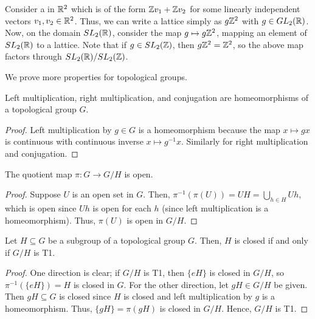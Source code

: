 Consider a  in $\mathbb{R}^{2}$ which is of the form $\mathbb{Z} v_{1} + \mathbb{Z} v_{2}$ for some linearly independent vectors $v_{1},v_{2} \in \mathbb{R}^{2}$. Thus, we can write a lattice simply as $g \mathbb{Z}^{2}$ with $g \in GL_{2}(\mathbb{R})$. Now, on the domain $SL_{2}(\mathbb{R})$, consider the map $g \mapsto g\mathbb{Z}^{2}$, mapping an element of $SL_{2}(\mathbb{R})$ to a lattice. Note that if $g \in SL_{2}(\mathbb{Z})$, then $g\mathbb{Z}^{2} = \mathbb{Z}^{2}$, so the above map factors through $SL_{2}(\mathbb{R})/SL_{2}(\mathbb{Z})$.

We prove more properties for topological groups.

\begin{proposition}
    Left multiplication, right multiplication, and conjugation are homeomorphisms of a topological group $G$.
\end{proposition}
\begin{proof}
    Left multiplication by $g \in G$ is a homeomorphism because the map $x \mapsto gx$ is continuous with continuous inverse $x \mapsto g^{-1}x$. Similarly for right multiplication and conjugation.
\end{proof}

\begin{proposition}
    The quotient map $\pi : G \to G/H$ is open.
\end{proposition}
\begin{proof}
    Suppose $U$ is an open set in $G$. Then, $\pi^{-1}(\pi(U)) = UH = \bigcup_{h \in H} Uh$, which is open since $Uh$ is open for each $h$ (since left multiplication is a homeomorphism). Thus, $\pi(U)$ is open in $G/H$.
\end{proof}


\begin{theorem}
    Let $H \subseteq G$ be a subgroup of a topological group $G$. Then, $H$ is closed if and only if $G/H$ is T1.
\end{theorem}
\begin{proof}
    One direction is clear; if $G/H$ is T1, then $\{eH\}$ is closed in $G/H$, so $\pi^{-1}(\{eH\}) = H$ is closed in $G$. For the other direction, let $gH \in G/H$ be given. Then $gH \subseteq G$ is closed since $H$ is closed and left multiplication by $g$ is a homeomorphism. Thus, $\{gH\} = \pi(gH)$ is closed in $G/H$. Hence, $G/H$ is T1.
\end{proof}
